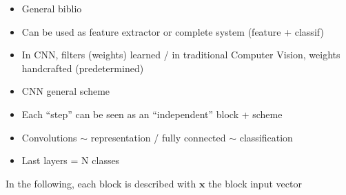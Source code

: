\label{intro}

\begin{itemize}
 \item General biblio
 \item Can be used as feature extractor or complete system (feature + classif)
 \item In CNN, filters (weights) learned / in traditional Computer Vision, weights handcrafted (predetermined)
 \item CNN general scheme
 \item Each ``step'' can be seen as an ``independent'' block + scheme 
 \item Convolutions $\sim$ representation / fully connected $\sim$ classification
 \item Last layers = N classes
\end{itemize}

In the following, each block is described with $\mathbf{x}$ the block input vector 
